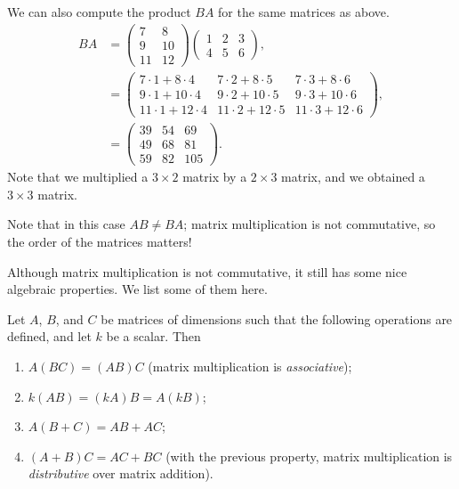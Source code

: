 \documentclass{ximera}
\begin{document}
\begin{example}
We can also compute the product $BA$ for the same matrices as above.
\begin{align*}
BA &= \left(\begin{array}{cc}7&8\\9&10\\11&12\end{array}\right)\left(\begin{array}{ccc}1&2&3\\4&5&6\end{array}\right),\\
&= \left(\begin{array}{ccc}7\cdot 1 + 8\cdot 4 & 7\cdot 2 + 8\cdot 5 & 7\cdot 3 + 8\cdot 6\\
9\cdot 1 + 10\cdot 4 & 9\cdot 2 + 10\cdot 5 & 9\cdot 3 + 10\cdot 6\\
11\cdot 1 + 12\cdot 4 & 11\cdot 2 + 12\cdot 5 & 11\cdot 3 + 12\cdot 6\end{array}\right),\\
&= \left(\begin{array}{ccc}39 & 54 & 69\\
49 & 68 & 81\\
59 & 82 & 105\end{array}\right).
\end{align*}
Note that we multiplied a $3\times 2$ matrix by a $2\times 3$ matrix, and we obtained a $3\times 3$ matrix.

Note that in this case $AB\neq BA$; matrix multiplication is not commutative, so the order of the matrices matters!
\end{example}

Although matrix multiplication is not commutative, it still has some nice algebraic properties. We list some of them here.

\begin{proposition}
Let $A$, $B$, and $C$ be matrices of dimensions such that the following operations are defined, and let $k$ be a scalar. Then
\begin{enumerate}
\item $A(BC) = (AB)C$ (matrix multiplication is \emph{associative});
\item $k(AB) = (kA)B = A(kB)$;
\item $A(B+C) = AB+AC$;
\item $(A+B)C = AC+BC$ (with the previous property, matrix multiplication is \emph{distributive} over matrix addition).
\end{enumerate}
\end{proposition}
\end{document}
